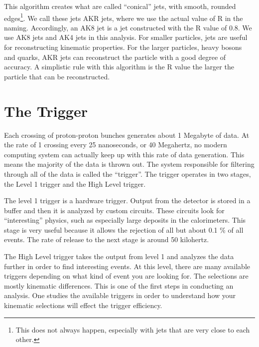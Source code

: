 This algorithm creates what are called ``conical'' jets, with smooth, rounded edges\footnote{This does not always happen, especially with jets that are very close to each other.}.
We call these jets AKR jets, where we use the actual value of R in the naming. Accordingly, an AK8 jet is a jet constructed with the R value of 0.8.
We use AK8 jets and AK4 jets in this analysis. For smaller particles, jets are useful for reconstructing kinematic properties. 
For the larger particles, heavy bosons and quarks, AKR jets can reconstruct the particle with a good degree of accuracy. A simplistic rule with this algorithm is the R value the larger the particle that can be reconstructed.

\section{The Trigger\label{s:trigger}}

Each crossing of proton-proton bunches generates about 1 Megabyte of data. At the rate of 1 crossing every 25 nanoseconds, or 40 Megahertz, no modern computing system can actually keep up with this rate of data generation. 
This means the majority of the data is thrown out. The system responsible for filtering through all of the data is called the ``trigger''.
The trigger operates in two stages, the Level 1 trigger and the High Level trigger. 

The level 1 trigger is a hardware trigger. Output from the detector is stored in a buffer and then it is analyzed by custom circuits. 
These circuits look for ``interesting'' physics, such as especially large deposits in the calorimeters. 
This stage is very useful because it allows the rejection of all but about 0.1 \% of all events.
The rate of release to the next stage is around 50 kilohertz.

The High Level trigger takes the output from level 1 and analyzes the data further in order to find interesting events.
At this level, there are many available triggers depending on what kind of event you are looking for. The selections are mostly kinematic differences.
This is one of the first steps in conducting an analysis. One studies the available triggers in order to understand how your kinematic selections will effect the trigger efficiency.

